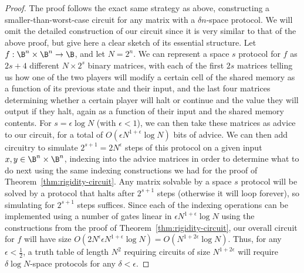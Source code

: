\begin{proof}
The proof follows the exact same strategy as above, constructing a smaller-than-worst-case circuit for any matrix with a $\delta n$-space protocol. We will omit the detailed construction of our circuit since it is very similar to that of the above proof, but give here a clear sketch of its essential structure. Let $f: \B^n \times \B^n \rightarrow \B$, and let $N = 2^n$. We can represent a space $s$ protocol for $f$ as $2s + 4$ different $N \times 2^s$ binary matrices, with each of the first $2s$ matrices telling us how one of the two players will modify a certain cell of the shared memory as a function of its previous state and their input, and the last four matrices determining whether a certain player will halt or continue and the value they will output if they halt, again as a function of their input and the shared memory contents. For $s = \epsilon \log N$ (with $\epsilon < 1$), we can then take these matrices as advice to our circuit, for a total of $O(\epsilon N^{1 + \epsilon} \log N)$ bits of advice. We can then add circuitry to simulate $2^{s+1} = 2N^{\epsilon}$ steps of this protocol on a given input $x,y \in \B^n \times \B^n$, indexing into the advice matrices in order to determine what to do next using the same indexing constructions we had for the proof of Theorem~\ref{thm:rigidity-circuit}. Any matrix solvable by a space $s$ protocol will be solved by a protocol that halts after $2^{s+1}$ steps (otherwise it will loop forever), so simulating for $2^{s+1}$ steps suffices. Since each of the indexing operations can be implemented using a number of gates linear in $\epsilon N^{1 + \epsilon} \log N$ using the constructions from the proof of Theorem~\ref{thm:rigidity-circuit}, our overall circuit for $f$ will have size $O(2N^{\epsilon}\epsilon N^{1 + \epsilon} \log N) = O(N^{1 + 2\epsilon} \log N)$. Thus, for any $\epsilon < \frac{1}{2}$, a truth table of length $N^2$ requiring circuits of size $N^{1 + 2\epsilon}$ will require $\delta \log N$-space protocols for any $\delta < \epsilon$.
\end{proof}

